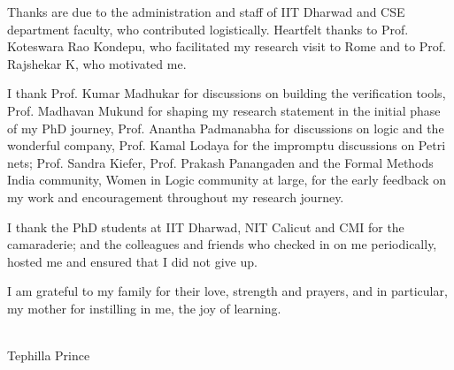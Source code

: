 {    Thanks are due to the administration and staff of IIT Dharwad and CSE department faculty, who contributed logistically. Heartfelt thanks to Prof. Koteswara Rao Kondepu, who facilitated my research visit to Rome and to Prof. Rajshekar K, who motivated me.

    I thank Prof. Kumar Madhukar for discussions on building the verification tools, Prof. Madhavan Mukund for shaping my research statement in the initial phase of my PhD journey, Prof. Anantha Padmanabha for discussions on logic and the wonderful company, Prof. Kamal Lodaya for the impromptu discussions on Petri nets; Prof. Sandra Kiefer, Prof. Prakash Panangaden and the Formal Methods India community, Women in Logic community at large, for the early feedback on my work and encouragement throughout my research journey.

    I thank the PhD students at IIT Dharwad, NIT Calicut and CMI for the camaraderie; and the colleagues and friends who checked in on me periodically, hosted me and ensured that I did not give up.

    I am grateful to my family for their love, strength and prayers, and in particular, my mother for instilling in me, the joy of learning.

    \vspace{2ex}

    \begin{flushright}
        \makebox[4cm]{\hrulefill} \\
        Tephilla Prince
    \end{flushright}
    ~
    ~
    ~
    ~
    ~

}
